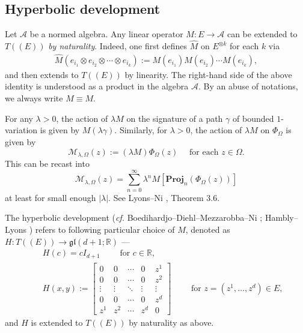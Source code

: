 \documentclass[11pt,a4paper,english,reqno]{amsart}
\theoremstyle{plain}
\newcommand{\R}{\mathbb{R}}
\newcommand{\1}{\mathbbm{1}}
\newcommand{\proj}{\mathbf{Proj}}
\begin{document}
\subsection{Hyperbolic development}

Let $\mathscr{A}$ be a normed algebra. Any linear operator $M: E\to\mathscr{A}$ can be extended to $T((E))$ \emph{by naturality}. Indeed, one first defines $\hat{M}$ on $E^{\otimes k}$ for each $k$ via
\begin{eqnarray*}
\hat{M}\left(e_{i_{1}} \otimes e_{i_{2}} \otimes \cdots \otimes e_{i_{k}}\right) := M(e_{i_{1}}) M(e_{i_{2}}) \cdots M(e_{i_{k}}), 
\end{eqnarray*}
and then extends to $T((E))$ by linearity. The right-hand side of the above identity is understood as a product in the algebra $\mathscr{A}$. By an abuse of notations, we always write $\hat{M} \equiv M$.

For any $\lambda >0$, the action of $\lambda M$ on the signature of a path $\gamma$ of bounded $1$-variation is given by $M(\lambda \gamma)$. Similarly, for $\lambda >0$, the action of $\lambda M$ on $\Phi_{\Omega}$ is given by
\begin{equation}\label{dev-new}
\mathcal{M}_{\lambda, \Omega}(z) := (\lambda M) \Phi_{\Omega}(z) \quad \text{ for each } z \in \Omega.
\end{equation}
This can be recast into
\begin{equation}\label{M}
\mathcal{M}_{\lambda, \Omega}(z) =  \sum_{n=0}^\infty \lambda^n M\left[ \proj_n(\Phi_\Omega(z))\right]
\end{equation}
at least for small enough $|\lambda|$. See Lyons--Ni \cite{ni2012expected}, Theorem 3.6.

The hyperbolic development (\emph{cf.} Boedihardjo--Diehl--Mezzarobba--Ni \cite{boedihardjo2021expected}; Hambly--Lyons \cite{hl}) refers to following particular choice of $M$, denoted as $H: T((E)) \to \mathfrak{gl}(d+1;\R)$ ---
\begin{eqnarray*}
&& H(c) =  c I_{d+1} \qquad \text{ for } c \in \R,\\
&&
H (x,y) := \begin{bmatrix}
0&0&\cdots &0 & z^1\\
0&0&\cdots &0 & z^2\\
\vdots & \vdots &\ddots &\vdots& \vdots \\
0&0&\cdots &0 & z^d\\
z^1&z^2&\cdots &z^{d}&0
\end{bmatrix}\qquad \text{ for } z = \left(z^1,\ldots,z^d\right) \in E,
\end{eqnarray*}
and $H$ is extended to $T((E))$ by naturality as above. 
\end{document}

